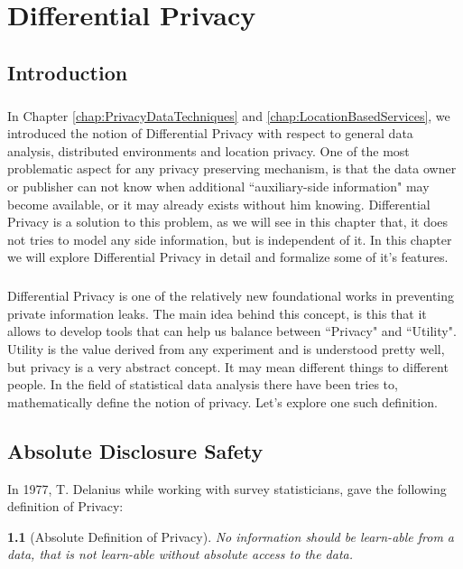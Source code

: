 \documentclass[12pt]{report}
\theoremstyle{named}
\newtheorem*{namedtheorem}{}
\begin{document}
\chapter{Differential Privacy}
\label{chap:differentialPrivacy}
\section{Introduction}
\paragraph{}
In Chapter \ref{chap:PrivacyDataTechniques} and \ref{chap:LocationBasedServices}, we introduced the notion of Differential Privacy with respect to general data analysis, distributed environments and location privacy. One of the most problematic aspect for any privacy preserving mechanism, is that the data owner or publisher can not know when additional ``auxiliary-side information" may become available, or it may already exists without him knowing. Differential Privacy is a solution to this problem, as we will see in this chapter that, it does not tries to model any side information, but is independent of it. In this chapter we will explore Differential Privacy in detail and formalize some of it's features. 

\paragraph{}
Differential Privacy \cite{Dwork:2006:DP:2097282.2097284} is one of the relatively new foundational works in preventing private information leaks. The main idea behind this concept, is this that it allows to develop tools that can help us balance between ``Privacy" and ``Utility". Utility is the value derived from any experiment and is understood pretty well, but privacy is a very abstract concept. It may mean different things to different people. In the field of statistical data analysis there have been tries to, mathematically define the notion of privacy. Let's explore one such definition.

\section{Absolute Disclosure Safety}

In 1977, T. Delanius while working with survey statisticians, gave the following definition of Privacy:
\begin{namedtheorem}[Absolute Definition of Privacy\cite{dalenius1977}]
No information should be learn-able from a data, that is not learn-able without absolute access to the data.
\end{namedtheorem}
\end{document}
